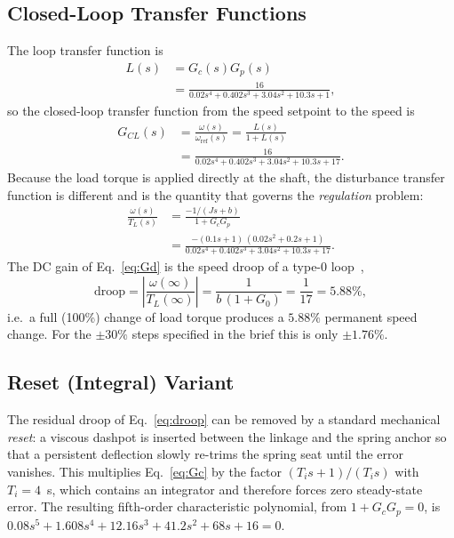 \documentclass[conference]{IEEEtran}
\begin{document}
\subsection{Closed-Loop Transfer Functions}
The loop transfer function is
\begin{equation}
\begin{split}
L(s)&=G_c(s)G_p(s)\\
&=\frac{16}{0.02s^{4}+0.402s^{3}+3.04s^{2}+10.3s+1},
\end{split}
\label{eq:L}
\end{equation}
so the closed-loop transfer function from the speed setpoint to the speed is
\begin{equation}
\begin{split}
G_{CL}(s)&=\frac{\omega(s)}{\omega_{\mathrm{ref}}(s)}=\frac{L(s)}{1+L(s)}\\
&=\frac{16}{0.02s^{4}+0.402s^{3}+3.04s^{2}+10.3s+17}.
\end{split}
\label{eq:GCL}
\end{equation}
Because the load torque is applied directly at the shaft, the disturbance transfer
function is different and is the quantity that governs the \emph{regulation}
problem:
\begin{equation}
\begin{split}
\frac{\omega(s)}{T_L(s)}&=\frac{-1/(Js+b)}{1+G_cG_p}\\
&=\frac{-(0.1s+1)\,(0.02s^{2}+0.2s+1)}
{0.02s^{4}+0.402s^{3}+3.04s^{2}+10.3s+17}.
\end{split}
\label{eq:Gd}
\end{equation}
The DC gain of Eq.~\eqref{eq:Gd} is the speed droop of a type-0 loop~\cite{dorf},
\begin{equation}
\text{droop}=\left|\frac{\omega(\infty)}{T_L(\infty)}\right|
=\frac{1}{b\,(1+G_0)}=\frac{1}{17}=5.88\%,
\label{eq:droop}
\end{equation}
i.e.\ a full (100\%) change of load torque produces a $5.88\%$ permanent speed
change. For the $\pm30\%$ steps specified in the brief this is only $\pm1.76\%$.

\subsection{Reset (Integral) Variant}
The residual droop of Eq.~\eqref{eq:droop} can be removed by a standard mechanical
\emph{reset}: a viscous dashpot is inserted between the linkage and the spring
anchor so that a persistent deflection slowly re-trims the spring seat until the
error vanishes. This multiplies Eq.~\eqref{eq:Gc} by the factor $(T_is+1)/(T_is)$ with
$T_i=4$~s, which contains an integrator and therefore forces zero steady-state
error. The resulting fifth-order characteristic polynomial, from $1+G_cG_p=0$, is
$0.08s^{5}+1.608s^{4}+12.16s^{3}+41.2s^{2}+68s+16=0$.
\end{document}
